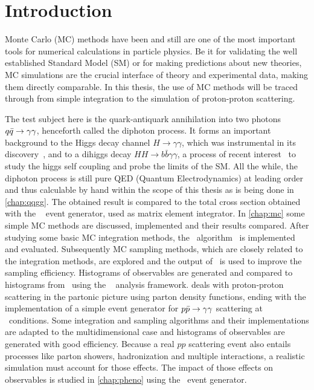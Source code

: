 \chapter{Introduction}%
\label{chap:intro}

Monte Carlo (MC) methods have been and still are one of the most
important tools for numerical calculations in particle physics. Be it
for validating the well established Standard Model (SM) or for making
predictions about new theories, MC simulations are the crucial
interface of theory and experimental data, making them directly
comparable.
In this thesis, the use of MC methods will be traced through from
simple integration to the simulation of proton-proton scattering.

The test subject here is the quark-antiquark annihilation into two
photons \(q\bar{q}\rightarrow\gamma\gamma\), henceforth called the diphoton process. It forms an
important background to the Higgs decay channel
\(H\rightarrow \gamma\gamma\), which was instrumental in its
discovery~\cite{Aad:2012tfa,Chatrchyan:2012ufa}, and to a dihiggs
decay \(HH\rightarrow b\bar{b}\gamma\gamma\), a process of recent
interest~\cite{aaboud2018:sf} to study the higgs self coupling and
probe the limits of the SM. All the while, the diphoton process is
still pure QED (Quantum Electrodynamics) at leading order and thus
calculable by hand within the scope of this thesis as is being done in
\cref{chap:qqgg}. The obtained result is compared to the total cross
section obtained with the \sherpa~\cite{Gleisberg:2008ta} event
generator, used as matrix element integrator. In \cref{chap:mc} some
simple MC methods are discussed, implemented and their results
compared. After studying some basic MC integration methods, the
\vegas\ algorithm~\cite{Lepage:19781an} is implemented and
evaluated. Subsequently MC sampling methods, which are closely related
to the integration methods, are explored and the output of \vegas\ is
used to improve the sampling efficiency. Histograms of observables are
generated and compared to histograms from \sherpa\ using the
\rivet~\cite{Bierlich:2019rhm} analysis framework. 
deals with proton-proton scattering in the partonic picture using
parton density functions, ending with the implementation of a simple
event generator for \(p\bar{p}\rightarrow\gamma\gamma\) scattering at \lhc\ conditions. Some
integration and sampling algorithms and their implementations are
adapted to the multidimensional case and histograms of observables are
generated with good efficiency. Because a real \(pp\) scattering event
also entails processes like parton showers, hadronization and multiple
interactions, a realistic simulation must account for those
effects. The impact of those effects on observables is studied in
\cref{chap:pheno} using the \sherpa\ event generator.

